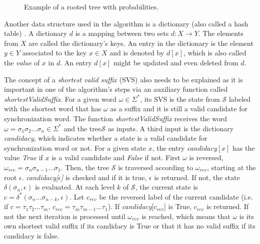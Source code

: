 {\begin{figure}
\centering
{}
\caption{Example of a rooted tree with probabilities. \label{fig:rtp}}
\end{figure}
 
 Another data structure used in the algorithm is a dictionary (also called a hash table) \citep{thomas2001introduction}. A dictionary $d$ is a mapping between two sets $d: X \rightarrow Y$. The elements from $X$ are called the dictionary's keys. An entry in the dictionary is the element $y \in Y$ associated to the key $x \in X$ and is denoted by $d[x]$, which is also called the \textit{value} of $x$ in $d$. An entry $d[x]$ might be updated and even deleted from $d$.
 
The concept of a \textit{shortest valid suffix} (SVS) also needs to be explained as it is important in one of the algorithm's steps via an auxiliary function called \textit{shortestValidSuffix}. For a given word $\omega \in \Sigma^*$, its SVS is the state from $\mathcal{S}$ labeled with the shortest word that has $\omega$ as a suffix and it is still a valid candidate for synchronization word. The function \textit{shortestValidSuffix} receives the word $\omega = \sigma_1\sigma_2\ldots\sigma_n \in \Sigma^*$ and the tree$\mathcal{S}$ as inputs. A third input is the dictionary \textit{candidacy}, which indicates whether a state is a valid candidate for synchronization word or not. For a given state $x$, the entry \textit{candidacy}$[x]$ has the value \textit{True} if $x$ is a valid candidate and \textit{False} if not. First $\omega$ is reversed, $\omega_{rev} = \sigma_n\sigma_{n-1}\ldots\sigma_1$. Then, the tree $\mathcal{S}$ is traversed according to $\omega_{rev}$, starting at the root $\epsilon$. \textit{candidacy[$\epsilon$]} is checked and if it is true, $\epsilon$ is returned. If not, the state $\delta(\sigma_n, \epsilon)$ is evaluated. At each level $k$ of $\mathcal{S}$, the current state is $c = \delta^*(\sigma_n\ldots\sigma_{n-k},\epsilon)$. Let $c_{rev}$ be the reversed label of the current candidate (i.e. if $c = \tau_1\tau_2\ldots\tau_m$, $c_{rev} = \tau_m\tau_{m-1}\ldots\tau_1$). If \textit{candidacy}[$c_{rev}$] is True, $c_{rev}$ is returned. If not the next iteration is processed until $\omega_{rev}$ is reached, which means that $\omega$ is its own shortest valid suffix if its candidacy is True or that it has no valid suffix if its candidacy is false.
 
}
